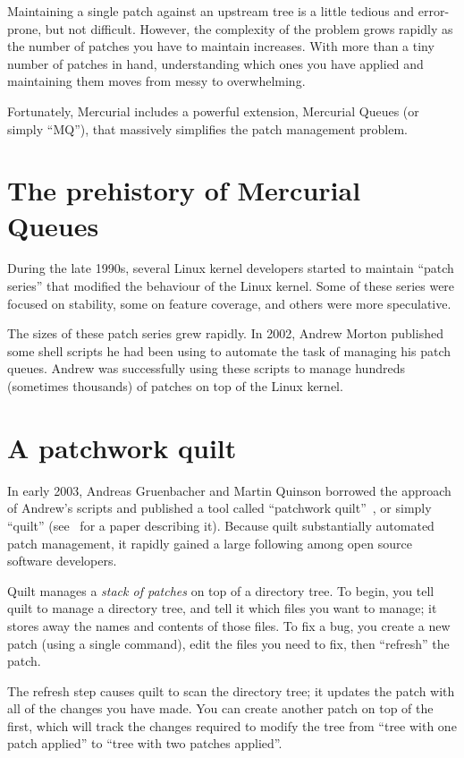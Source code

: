 Maintaining a single patch against an upstream tree is a little
tedious and error-prone, but not difficult.  However, the complexity
of the problem grows rapidly as the number of patches you have to
maintain increases.  With more than a tiny number of patches in hand,
understanding which ones you have applied and maintaining them moves
from messy to overwhelming.

Fortunately, Mercurial includes a powerful extension, Mercurial Queues
(or simply ``MQ''), that massively simplifies the patch management
problem.

\section{The prehistory of Mercurial Queues}
\label{sec:mq:history}

During the late 1990s, several Linux kernel developers started to
maintain ``patch series'' that modified the behaviour of the Linux
kernel.  Some of these series were focused on stability, some on
feature coverage, and others were more speculative.

The sizes of these patch series grew rapidly.  In 2002, Andrew Morton
published some shell scripts he had been using to automate the task of
managing his patch queues.  Andrew was successfully using these
scripts to manage hundreds (sometimes thousands) of patches on top of
the Linux kernel.

\section{A patchwork quilt}
\label{sec:mq:quilt}

In early 2003, Andreas Gruenbacher and Martin Quinson borrowed the
approach of Andrew's scripts and published a tool called ``patchwork
quilt''~\cite{web:quilt}, or simply ``quilt''
(see~\cite{gruenbacher:2005} for a paper describing it).  Because
quilt substantially automated patch management, it rapidly gained a
large following among open source software developers.

Quilt manages a \emph{stack of patches} on top of a directory tree.
To begin, you tell quilt to manage a directory tree, and tell it which
files you want to manage; it stores away the names and contents of
those files.  To fix a bug, you create a new patch (using a single
command), edit the files you need to fix, then ``refresh'' the patch.

The refresh step causes quilt to scan the directory tree; it updates
the patch with all of the changes you have made.  You can create
another patch on top of the first, which will track the changes
required to modify the tree from ``tree with one patch applied'' to
``tree with two patches applied''.

